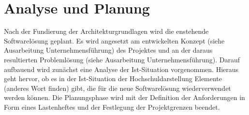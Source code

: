 \section{Analyse und Planung}
\label{sec:AnalyseUndPlanung}

Nach der Fundierung der Architekturgrundlagen wird die enstehende Softwarelösung geplant. Es wird angesetzt am 
entwickelten Konzept (siehe Ausarbeitung Unternehmensführung) des Projektes und an der daraus resultierten Problemlösung 
(siehe Ausarbeitung Unternehmensführung). Darauf aufbauend wird zunächst eine Analyse der Ist-Situation vorgenommen. 
Hieraus geht hervor, ob es in der Ist-Situation der Hochschuldarstellung Elemente (anderes Wort finden) gibt, die für die 
neue Softwarelösung wiederverwendet werden können. Die Planungsphase wird mit der Definition der Anforderungen in 
Form eines Lastenheftes und der Festlegung der Projektgrenzen beendet.